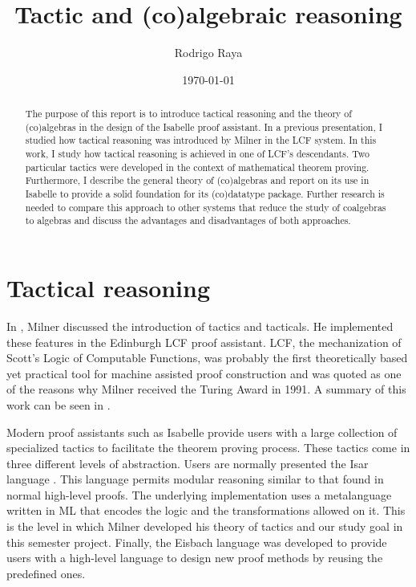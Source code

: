 \documentclass[notitlepage]{article}
\title{Tactic and (co)algebraic reasoning}
\author{Rodrigo Raya}
\date{\today}
\begin{document}
\maketitle
\thispagestyle{empty}

\begin{abstract}
The purpose of this report is to introduce tactical reasoning and the theory of (co)algebras in the design of the Isabelle proof assistant. In a previous presentation, I studied how tactical reasoning was introduced by Milner in the LCF system. In this work, I study how tactical reasoning is achieved in one of LCF's descendants. Two particular tactics were developed in the context of mathematical theorem proving. Furthermore, I describe the general theory of (co)algebras and report on its use in Isabelle to provide a solid foundation for its (co)datatype package. Further research is needed to compare this approach to other systems that reduce the study of coalgebras to algebras and discuss the advantages and disadvantages of both approaches.
\end{abstract}

\section{Tactical reasoning}

In \cite{milner1984use}, Milner discussed the introduction of tactics and tacticals. He implemented these features in the Edinburgh LCF proof assistant. LCF, the mechanization of Scott’s Logic of Computable Functions, was probably the first theoretically based yet practical tool for machine assisted proof construction and was quoted as one of the reasons why Milner received the Turing Award in 1991. A summary of this work can be seen in \cite{presentation}. 

Modern proof assistants such as Isabelle provide users with a large collection of specialized tactics to facilitate the theorem proving process. These tactics come in three different levels of abstraction. Users are normally presented the Isar language \cite{wenzel2002isabelle}. This language permits modular reasoning similar to that found in normal high-level proofs. The underlying implementation uses a metalanguage written in ML that encodes the logic and the transformations allowed on it. This is the level in which Milner developed his theory of tactics and our study goal in this semester project. Finally, the Eisbach language was developed to provide users with a high-level language to design new proof methods by reusing the predefined ones. 
\end{document}
